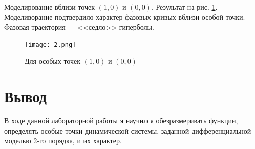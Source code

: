 \documentclass[14pt]{extarticle}
\begin{document}
Моделирование вблизи точек $(1,0)$ и $(0,0)$. Результат на рис. \ref{second}. Моделиворание подтвердило характер фазовых кривых вблизи особой точки. Фазовая траектория --- <<седло>> гиперболы.
\begin{figure}[!h]
  \centering
  \texttt{[image: 2.png]}
  \caption{Для особых точек $(1,0)$ и $(0,0)$\label{second}}
\end{figure}

\newpage
\section{Вывод}
В ходе данной лабораторной работы я научился обезразмеривать функции, определять особые точки динамической системы, заданной дифференциальной моделью 2-го порядка, и их характер.
\end{document}
